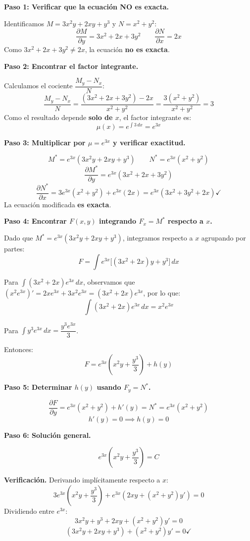 \begin{respuesta}

\textbf{Paso 1: Verificar que la ecuación NO es exacta.}

Identificamos $M = 3x^2y + 2xy + y^3$ y $N = x^2 + y^2$:
\[
    \frac{\partial M}{\partial y} = 3x^2 + 2x + 3y^2 \qquad
    \frac{\partial N}{\partial x} = 2x
\]
Como $3x^2 + 2x + 3y^2 \neq 2x$, la ecuación \textbf{no es exacta}.

\medskip
\textbf{Paso 2: Encontrar el factor integrante.}

Calculamos el cociente $\dfrac{M_y - N_x}{N}$:
\[
    \frac{M_y - N_x}{N} 
    = \frac{(3x^2 + 2x + 3y^2) - 2x}{x^2 + y^2}
    = \frac{3(x^2 + y^2)}{x^2 + y^2} = 3
\]
Como el resultado depende \textbf{solo de $x$}, el factor integrante es:
\[
    \mu(x) = e^{\int 3\,dx} = e^{3x}
\]

\medskip
\textbf{Paso 3: Multiplicar por $\mu = e^{3x}$ y verificar exactitud.}

\[
    M^* = e^{3x}(3x^2y + 2xy + y^3) \qquad N^* = e^{3x}(x^2 + y^2)
\]
\[
    \frac{\partial M^*}{\partial y} = e^{3x}(3x^2 + 2x + 3y^2)
\]
\[
    \frac{\partial N^*}{\partial x} = 3e^{3x}(x^2+y^2) + e^{3x}(2x) 
    = e^{3x}(3x^2 + 3y^2 + 2x) \checkmark
\]
La ecuación modificada \textbf{es exacta}.

\medskip
\textbf{Paso 4: Encontrar $F(x,y)$ integrando $F_x = M^*$ respecto a $x$.}

Dado que $M^* = e^{3x}(3x^2y + 2xy + y^3)$, integramos respecto a $x$
agrupando por partes:
\[
    F = \int e^{3x}\bigl[(3x^2 + 2x)y + y^3\bigr]\,dx
\]

Para $\displaystyle\int(3x^2 + 2x)e^{3x}\,dx$, observamos que 
$(x^2 e^{3x})' = 2xe^{3x} + 3x^2e^{3x} = (3x^2+2x)e^{3x}$,
por lo que:
\[
    \int(3x^2+2x)e^{3x}\,dx = x^2e^{3x}
\]

Para $\displaystyle\int y^3 e^{3x}\,dx = \dfrac{y^3 e^{3x}}{3}$.

Entonces:
\[
    F = e^{3x}\!\left(x^2 y + \frac{y^3}{3}\right) + h(y)
\]

\medskip
\textbf{Paso 5: Determinar $h(y)$ usando $F_y = N^*$.}

\[
    \frac{\partial F}{\partial y} = e^{3x}\!\left(x^2 + y^2\right) 
    + h'(y) = N^* = e^{3x}(x^2 + y^2)
\]
\[
    h'(y) = 0 \implies h(y) = 0
\]

\medskip
\textbf{Paso 6: Solución general.}

\[
    \boxed{e^{3x}\!\left(x^2 y + \frac{y^3}{3}\right) = C}
\]

\medskip
\textbf{Verificación.} Derivando implícitamente respecto a $x$:
\[
    3e^{3x}\!\left(x^2y + \frac{y^3}{3}\right) 
    + e^{3x}\!\left(2xy + (x^2 + y^2)y'\right) = 0
\]
Dividiendo entre $e^{3x}$:
\[
    3x^2y + y^3 + 2xy + (x^2 + y^2)y' = 0
\]
\[
    (3x^2y + 2xy + y^3) + (x^2 + y^2)y' = 0 \checkmark
\]

\end{respuesta}
